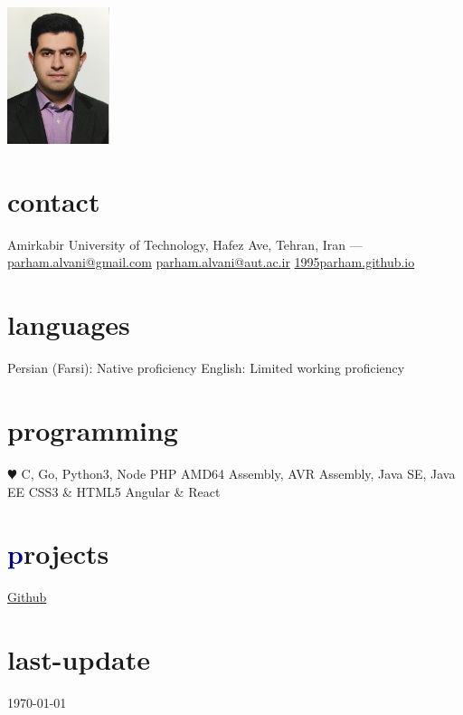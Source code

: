\documentclass[]{friggeri-cv} %
\begin{document}


\begin{aside} %
  \includegraphics[width=3cm, height=4cm]{../parham_alvani_pers.jpg}
  \section{\textcolor{TextYellow}{c}ontact}
  Amirkabir University of Technology,
  Hafez Ave,
  Tehran, Iran
  ---
  \href{mailto:parham.alvani@gmail.com}{parham.alvani@gmail.com}
  \href{mailto:parham.alvani@aut.ac.ir}{parham.alvani@aut.ac.ir}
  \href{https://1995parham.github.io/}{1995parham.github.io}
  \section{\textcolor{TextOrange}{l}anguages}
  Persian (Farsi):
  Native proficiency
  English:
  Limited working proficiency
  \section{\textcolor{TextGreen}{p}rogramming}
  {\color{red} $\varheartsuit$} C, Go, Python3, Node
  PHP
  AMD64 Assembly,
  AVR Assembly,
  Java SE, Java EE
  CSS3 \& HTML5
  Angular \& React
  \section{\textcolor{DarkBlue}{p}rojects}
  \href{https://github.com/1995parham}{\textcolor{TextGreen}{Github}}
  \section{\textcolor{Ocean}{last}-update}
  \today
\end{aside}
\end{document}
